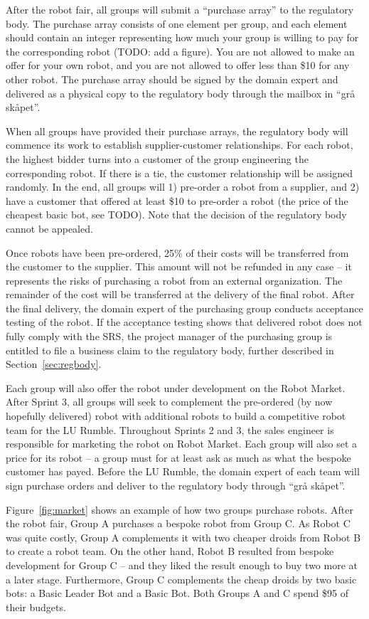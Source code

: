 \documentclass{scrreprt}
\begin{document}
After the robot fair, all groups will submit a ``purchase array'' to the regulatory body. The purchase array consists of one element per group, and each element should contain an integer representing how much your group is willing to pay for the corresponding robot (TODO: add a figure). You are not allowed to make an offer for your own robot, and you are not allowed to offer less than \$10 for any other robot. The purchase array should be signed by the domain expert and delivered as a physical copy to the regulatory body through the mailbox in ``grå skåpet''.

When all groups have provided their purchase arrays, the regulatory body will commence its work to establish supplier-customer relationships. For each robot, the highest bidder turns into a customer of the group engineering the corresponding robot. If there is a tie, the customer relationship will be assigned randomly. In the end, all groups will 1) pre-order a robot from a supplier, and 2) have a customer that offered at least \$10 to pre-order a robot (the price of the cheapest basic bot, see TODO). Note that the decision of the regulatory body cannot be appealed. 

Once robots have been pre-ordered, 25\% of their costs will be transferred from the customer to the supplier. This amount will not be refunded in any case -- it represents the risks of purchasing a robot from an external organization. The remainder of the cost will be transferred at the delivery of the final robot. After the final delivery, the domain expert of the purchasing group conducts acceptance testing of the robot. If the acceptance testing shows that delivered robot does not fully comply with the SRS, the project manager of the purchasing group is entitled to file a business claim to the regulatory body, further described in Section~\ref{sec:regbody}.

Each group will also offer the robot under development on the Robot Market. After Sprint 3, all groups will seek to complement the pre-ordered (by now hopefully delivered) robot with additional robots to build a competitive robot team for the LU Rumble. Throughout Sprints 2 and 3, the sales engineer is responsible for marketing the robot on Robot Market. Each group will also set a price for its robot -- a group must for at least ask as much as what the bespoke customer has payed. Before the LU Rumble, the domain expert of each team will sign purchase orders and deliver to the regulatory body through ``grå skåpet''. 

Figure~\ref{fig:market} shows an example of how two groups purchase robots. After the robot fair, Group A purchases a bespoke robot from Group C. As Robot C was quite costly, Group A complements it with two cheaper droids from Robot B to create a robot team. On the other hand, Robot B resulted from bespoke development for Group C -- and they liked the result enough to buy two more at a later stage. Furthermore, Group C complements the cheap droids by two basic bots: a Basic Leader Bot and a Basic Bot. Both Groups A and C spend \$95 of their budgets.
\end{document}
